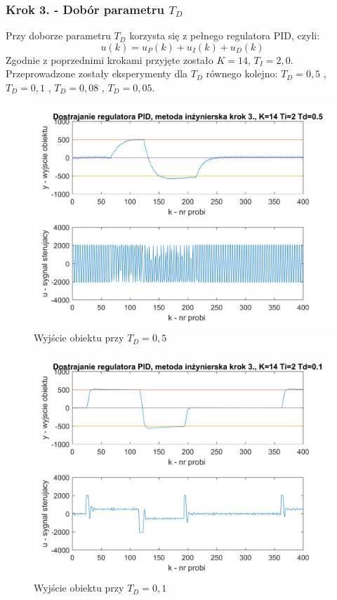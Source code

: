 \documentclass[a4paper, 10pt]{article}
\begin{document}
\subsubsection{Krok 3. - Dobór parametru $T_{D}$}

Przy doborze parametru $T_{D}$ korzysta się z pełnego regulatora PID, czyli:\\
\[u(k)=u_{P}(k)+u_{I}(k)+ u_{D}(k)\]
Zgodnie z poprzednimi krokami przyjęte zostało $K=14$, $T_{I}=2,0$.
Przeprowadzone zostały eksperymenty dla $T_{D}$ równego kolejno: $T_{D}=0,5$ , $T_{D}=0,1$ , $T_{D}=0,08$ , $T_{D}=0,05$.

\begin{figure}[H]
	\centering
	\includegraphics[width=0.9\linewidth]{MI_td500}
	\caption{Wyjście obiektu przy $T_{D}=0,5$ }
	\label{fig:MI_td500}
\end{figure}
\begin{figure}[H]
	\centering
	\includegraphics[width=0.9\linewidth]{MI_td100}
	\caption{Wyjście obiektu przy $T_{D}=0,1$ }
	\label{fig:MI_td100}
\end{figure}
\end{document}
